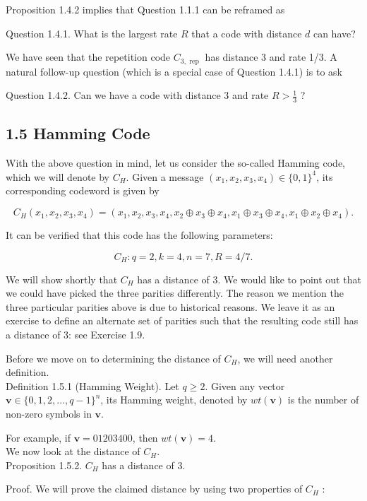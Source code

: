 \documentclass[10pt]{article}
\begin{document}
Proposition 1.4.2 implies that Question 1.1.1 can be reframed as

Question 1.4.1. What is the largest rate $R$ that a code with distance $d$ can have?

We have seen that the repetition code $C_{3, \text { rep }}$ has distance 3 and rate 1/3. A natural follow-up question (which is a special case of Question 1.4.1) is to ask

Question 1.4.2. Can we have a code with distance 3 and rate $R>\frac{1}{3}$ ?

\subsection*{1.5 Hamming Code}
With the above question in mind, let us consider the so-called Hamming code, which we will denote by $C_{H}$. Given a message $\left(x_{1}, x_{2}, x_{3}, x_{4}\right) \in\{0,1\}^{4}$, its corresponding codeword is given by

$$
C_{H}\left(x_{1}, x_{2}, x_{3}, x_{4}\right)=\left(x_{1}, x_{2}, x_{3}, x_{4}, x_{2} \oplus x_{3} \oplus x_{4}, x_{1} \oplus x_{3} \oplus x_{4}, x_{1} \oplus x_{2} \oplus x_{4}\right) .
$$

It can be verified that this code has the following parameters:

$$
C_{H}: q=2, k=4, n=7, R=4 / 7 .
$$

We will show shortly that $C_{H}$ has a distance of 3. We would like to point out that we could have picked the three parities differently. The reason we mention the three particular parities above is due to historical reasons. We leave it as an exercise to define an alternate set of parities such that the resulting code still has a distance of 3: see Exercise 1.9.

Before we move on to determining the distance of $C_{H}$, we will need another definition.\\
Definition 1.5.1 (Hamming Weight). Let $q \geq 2$. Given any vector $\mathbf{v} \in\{0,1,2, \ldots, q-1\}^{n}$, its Hamming weight, denoted by $w t(\mathbf{v})$ is the number of non-zero symbols in $\mathbf{v}$.

For example, if $\mathbf{v}=01203400$, then $w t(\mathbf{v})=4$.\\
We now look at the distance of $C_{H}$.\\
Proposition 1.5.2. $C_{H}$ has a distance of 3.

Proof. We will prove the claimed distance by using two properties of $C_{H}$ :
\end{document}

